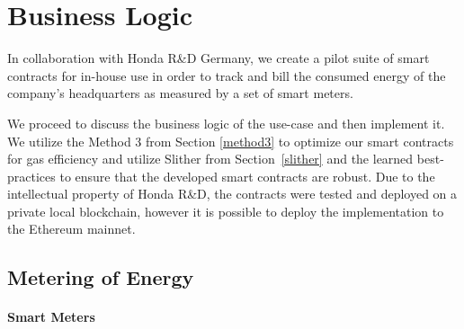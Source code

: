
\section{Business Logic} \label{business-logic}
In collaboration with Honda R\&D Germany, we create a pilot suite of smart contracts for in-house use in order to track and bill the consumed energy of the company's headquarters as measured by a set of smart meters. 

We proceed to discuss the business logic of the use-case and then implement it. We utilize the Method 3 from Section \ref{method3} to optimize our smart contracts for gas efficiency and utilize Slither from Section~\ref{slither} and the learned best-practices to ensure that the developed smart contracts are robust. Due to the intellectual property of Honda R\&D, the contracts were tested and deployed on a private local blockchain, however it is possible to deploy the implementation to the Ethereum mainnet.


\subsection{Metering of Energy} \label{metering}

\paragraph{Smart Meters}

